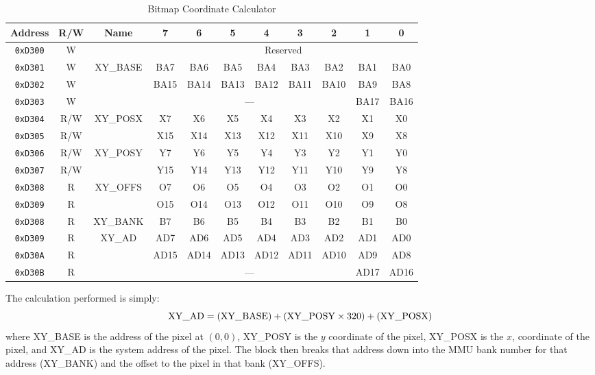 \begin{table}[ht]
    \begin{center}
        \begin{tabular}{|c|c|c|c|c|c|c|c|c|c|c|} \hline
            Address & R/W & Name & 7 & 6 & 5 & 4 & 3 & 2 & 1 & 0 \\\hline\hline
            \verb+0xD300+ & W & & \multicolumn{8}{|c|}{Reserved} \\ \hline

            \verb+0xD301+ & W & \multirow{3}{*}{XY\_BASE} & BA7 & BA6 & BA5 & BA4 & BA3 & BA2 & BA1 & BA0 \\ \cline{1-2}\cline{4-11}
            \verb+0xD302+ & W & & BA15 & BA14 & BA13 & BA12 & BA11 & BA10 & BA9 & BA8 \\ \cline{1-2}\cline{4-11}
            \verb+0xD303+ & W & & \multicolumn{6}{|c|}{---} & BA17 & BA16 \\ \hline

            \verb+0xD304+ & R/W & \multirow{2}{*}{XY\_POSX} & X7 & X6 & X5 & X4 & X3 & X2 & X1 & X0 \\ \cline{1-2}\cline{4-11}
            \verb+0xD305+ & R/W & & X15 & X14 & X13 & X12 & X11 & X10 & X9 & X8 \\ \hline
            
            \verb+0xD306+ & R/W & \multirow{2}{*}{XY\_POSY} & Y7 & Y6 & Y5 & Y4 & Y3 & Y2 & Y1 & Y0 \\ \cline{1-2}\cline{4-11}
            \verb+0xD307+ & R/W & & Y15 & Y14 & Y13 & Y12 & Y11 & Y10 & Y9 & Y8 \\ \hline
            
            \verb+0xD308+ & R & \multirow{2}{*}{XY\_OFFS} & O7 & O6 & O5 & O4 & O3 & O2 & O1 & O0 \\ \cline{1-2}\cline{4-11}
            \verb+0xD309+ & R & & O15 & O14 & O13 & O12 & O11 & O10 & O9 & O8 \\ \hline
            \verb+0xD308+ & R & XY\_BANK & B7 & B6 & B5 & B4 & B3 & B2 & B1 & B0 \\ \hline

            \verb+0xD309+ & R & \multirow{3}{*}{XY\_AD} & AD7 & AD6 & AD5 & AD4 & AD3 & AD2 & AD1 & AD0 \\ \cline{1-2}\cline{4-11}
            \verb+0xD30A+ & R & & AD15 & AD14 & AD13 & AD12 & AD11 & AD10 & AD9 & AD8 \\ \cline{1-2}\cline{4-11}
            \verb+0xD30B+ & R & & \multicolumn{6}{|c|}{---} & AD17 & AD16 \\ \hline
        \end{tabular}
    \end{center}
    \caption{Bitmap Coordinate Calculator}
    \label{tab:xy_addr}
\end{table}

The calculation performed is simply:
\[
    {\rm XY\_AD} = ({\rm XY\_BASE}) + ({\rm XY\_POSY} \times 320) + ({\rm XY\_POSX})
\]
where XY\_BASE is the address of the pixel at $(0, 0)$, XY\_POSY is the $y$ coordinate of the pixel, XY\_POSX is the $x$, coordinate of the pixel, and XY\_AD is the system address of the pixel. The block then breaks that address down into the MMU bank number for that address (XY\_BANK) and the offset to the pixel in that bank (XY\_OFFS).
